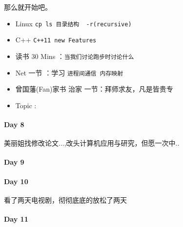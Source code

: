 \documentclass[UTF8,a4paper,8pt]{ctexart}
\begin{document}
	 	 那么就开始吧。
		 	 \begin{itemize}[itemindent = 1em]
		 	 	\renewcommand\labelitemi{\makebox[0pt][l]{$\square$}\hspace{1em}} 
		 	 	\renewcommand\labelitemi{\makebox[0pt][l]{$\square$}\raisebox{.15ex}{\hspace{0.1em}$\checkmark$}}	 	
		 	 	\item   Linux \verb|cp ls 目录结构  -r(recursive)|
		 	 	\item   C++   \verb|C++11 new Features|
		 	 	
		 	 	\item   读书  30 Mins	：\verb|当我们讨论跑步时讨论什么|	
		 	 	\item   Net 一节 ：学习 \verb|进程间通信 内存映射|	
		 	 	\renewcommand\labelitemi{\makebox[0pt][l]{$\square$}\hspace{1em}} 
		 	 	
		 	 	\renewcommand\labelitemi{\makebox[0pt][l]{$\square$}\raisebox{.15ex}{\hspace{0.1em}$\checkmark$}}
		 	 	\item   曾国藩(Fan)家书 治家 一节：拜师求友，凡是皆贵专
		 	 	\item   Topic :
		 	 \end{itemize}
 	 \paragraph{Day 8       \quad     }
			美丽姐找修改论文...,改头计算机应用与研究，但愿一次中..
			
 	 \paragraph{Day 9       \quad     }
 	 
 	 \paragraph{Day 10      \quad     }
	 	 看了两天电视剧，彻彻底底的放松了两天
 	 
 	 \paragraph{Day 11      \quad     }
 	 
\end{document}
